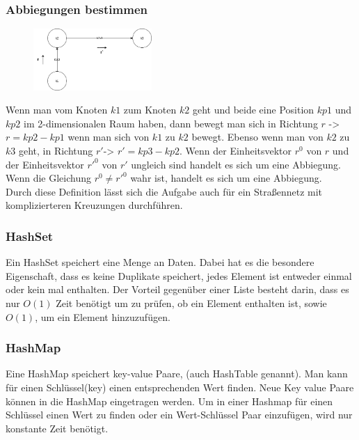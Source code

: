 \documentclass[a4paper,12pt,arial]{scrartcl}
\begin{document}
\subsubsection{Abbiegungen bestimmen}

\begin{figure}
    \centering
    \includegraphics[width=0.4\textwidth]{AbbiegenBWinf.png}
    \caption{}
    \label{fig:abbiegen}
    \vspace{-30pt}
\end{figure}
Wenn man vom Knoten $k1$  zum Knoten $k2$ geht und beide eine Position $kp1$ und $kp2$ im 2-dimensionalen Raum haben, dann bewegt man sich in Richtung $r$ -> $r = kp2-kp1$ wenn man sich von  $k1$ zu $k2$  bewegt. Ebenso wenn man von $k2$ zu $k3$ geht, in Richtung $r'$-> $r' =kp3-kp2$. 
Wenn der Einheitsvektor $r^{0}$ von $r$ und der Einheitsvektor $r'^{0}$ von $r'$ ungleich sind handelt es sich um eine Abbiegung.
Wenn die Gleichung $r^0 \ne r'^0$ wahr ist, handelt es sich um eine Abbiegung.\\
Durch diese Definition lässt sich die Aufgabe auch für ein Straßennetz mit komplizierteren Kreuzungen durchführen.

\subsubsection{HashSet}\label{sec:HashSet}
Ein HashSet speichert eine Menge an Daten. Dabei hat es die besondere Eigenschaft, dass es keine Duplikate speichert, jedes Element ist entweder einmal oder kein mal enthalten.
Der Vorteil gegenüber einer Liste besteht darin, dass es nur $O(1)$ Zeit benötigt um zu prüfen, ob ein Element enthalten ist, sowie $O(1)$, um ein Element hinzuzufügen.
\cite{drohandata}

\subsubsection{HashMap}
Eine HashMap speichert key-value Paare, (auch HashTable genannt). Man kann für einen Schlüssel(key) einen entsprechenden Wert finden. Neue Key value Paare können in die HashMap eingetragen werden.
Um in einer Hashmap für einen Schlüssel einen Wert zu finden oder ein Wert-Schlüssel Paar einzufügen, wird nur konstante Zeit benötigt.
\cite{hashMap}
\end{document}
